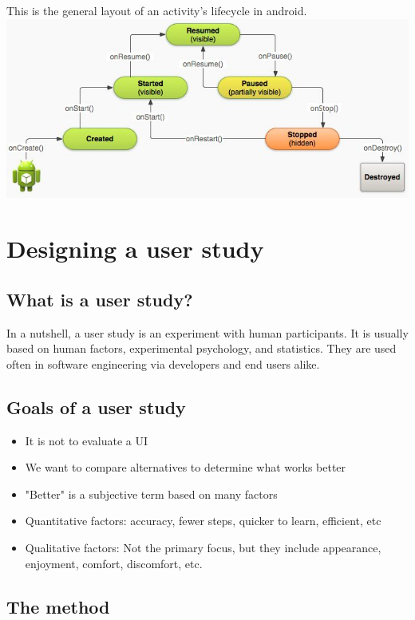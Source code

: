 \documentclass[12pt]{book}
\begin{document}
  This is the general layout of an activity's lifecycle in android.\\
  \includegraphics*[width=\textwidth]{lifecycle}

\newpage
\section*{Designing a user study}

\subsection*{What is a user study?}
In a nutshell, a user study is an experiment with human participants. It is usually based on human factors, experimental psychology, and statistics. They are used often in software engineering via developers and end users alike.

\subsection*{Goals of a user study}

\begin{itemize}
  \item It is not to evaluate a UI
  \item We want to compare alternatives to determine what works better
  \item "Better" is a subjective term based on many factors
  \item Quantitative factors: accuracy, fewer steps, quicker to learn, efficient, etc
  \item Qualitative factors: Not the primary focus, but they include appearance, enjoyment, comfort, discomfort, etc.
\end{itemize}

\subsection*{The method}
\end{document}
